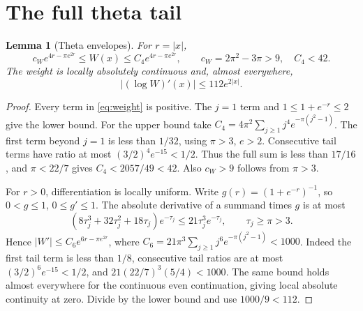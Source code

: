 \documentclass[11pt]{article}
\newtheorem{lemma}[theorem]{Lemma}
\theoremstyle{remark}
\begin{document}
\section{The full theta tail}
\begin{lemma}[Theta envelopes]\label{lem:theta}
For $r=|x|$,
\begin{equation}\label{eq:theta-envelope}
 c_W e^{4r-\pi e^{2r}}\le W(x)\le C_4 e^{4r-\pi e^{2r}},
 \qquad c_W=2\pi^2-3\pi>9,\quad C_4<42.
\end{equation}
The weight is locally absolutely continuous and, almost everywhere,
\begin{equation}\label{eq:logW}
 |(\log W)'(x)|\le112e^{2|x|}.
\end{equation}
\end{lemma}
\begin{proof}
Every term in \eqref{eq:weight} is positive. The $j=1$ term and
$1\le1+e^{-r}\le2$ give the lower bound.
For the upper bound take
$C_4=4\pi^2\sum_{j\ge1}j^4e^{-\pi(j^2-1)}$.
The first term beyond $j=1$ is less than $1/32$, using $\pi>3$, $e>2$.
Consecutive tail terms have ratio at most $(3/2)^4e^{-15}<1/2$.
Thus the full sum is less than $17/16$, and $\pi<22/7$ gives
$C_4<2057/49<42$. Also $c_W>9$ follows from $\pi>3$.

For $r>0$, differentiation is locally uniform. Write
$g(r)=(1+e^{-r})^{-1}$, so $0<g\le1$, $0\le g'\le1$.
The absolute derivative of a summand times $g$ is at most
\[
 (8\tau_j^3+32\tau_j^2+18\tau_j)e^{-\tau_j}
       \le21\tau_j^3e^{-\tau_j},\qquad \tau_j\ge\pi>3.
\]
Hence $|W'|\le C_6e^{6r-\pi e^{2r}}$, where
$C_6=21\pi^3\sum_{j\ge1}j^6e^{-\pi(j^2-1)}<1000$.
Indeed the first tail term is less than $1/8$, consecutive tail ratios
are at most $(3/2)^6e^{-15}<1/2$, and
$21(22/7)^3(5/4)<1000$.
The same bound holds almost everywhere for the continuous even
continuation, giving local absolute continuity at zero.
Divide by the lower bound and use $1000/9<112$.
\end{proof}
\end{document}
